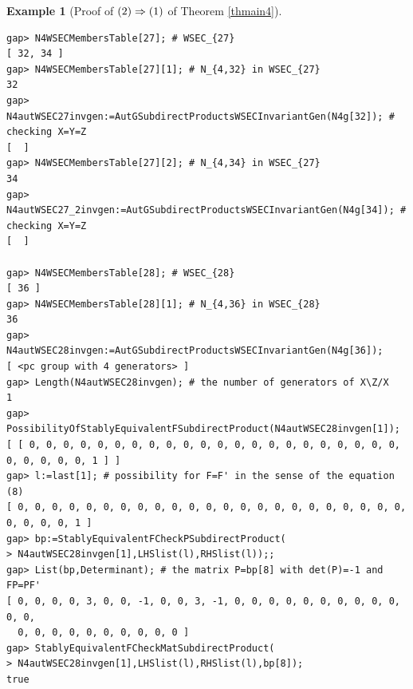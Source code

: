 \documentclass{amsart}
\theoremstyle{plain}
\theoremstyle{definition}
\newtheorem{example}[theorem]{Example}
\theoremstyle{remark}
\begin{document}
\begin{example}[Proof of ${\rm (2)}\Rightarrow {\rm (1)}$ of {Theorem \ref{thmain4}}]
\begin{verbatim}
gap> N4WSECMembersTable[27]; # WSEC_{27}
[ 32, 34 ]
gap> N4WSECMembersTable[27][1]; # N_{4,32} in WSEC_{27}
32
gap> N4autWSEC27invgen:=AutGSubdirectProductsWSECInvariantGen(N4g[32]); # checking X=Y=Z
[  ]
gap> N4WSECMembersTable[27][2]; # N_{4,34} in WSEC_{27}
34
gap> N4autWSEC27_2invgen:=AutGSubdirectProductsWSECInvariantGen(N4g[34]); # checking X=Y=Z
[  ]

gap> N4WSECMembersTable[28]; # WSEC_{28}
[ 36 ]
gap> N4WSECMembersTable[28][1]; # N_{4,36} in WSEC_{28}
36
gap> N4autWSEC28invgen:=AutGSubdirectProductsWSECInvariantGen(N4g[36]);
[ <pc group with 4 generators> ]
gap> Length(N4autWSEC28invgen); # the number of generators of X\Z/X
1
gap> PossibilityOfStablyEquivalentFSubdirectProduct(N4autWSEC28invgen[1]);
[ [ 0, 0, 0, 0, 0, 0, 0, 0, 0, 0, 0, 0, 0, 0, 0, 0, 0, 0, 0, 0, 0, 0, 0, 0, 0, 0, 0, 1 ] ]
gap> l:=last[1]; # possibility for F=F' in the sense of the equation (8)
[ 0, 0, 0, 0, 0, 0, 0, 0, 0, 0, 0, 0, 0, 0, 0, 0, 0, 0, 0, 0, 0, 0, 0, 0, 0, 0, 0, 1 ]
gap> bp:=StablyEquivalentFCheckPSubdirectProduct(
> N4autWSEC28invgen[1],LHSlist(l),RHSlist(l));;
gap> List(bp,Determinant); # the matrix P=bp[8] with det(P)=-1 and FP=PF'
[ 0, 0, 0, 0, 3, 0, 0, -1, 0, 0, 3, -1, 0, 0, 0, 0, 0, 0, 0, 0, 0, 0, 0, 0, 
  0, 0, 0, 0, 0, 0, 0, 0, 0, 0 ]
gap> StablyEquivalentFCheckMatSubdirectProduct(
> N4autWSEC28invgen[1],LHSlist(l),RHSlist(l),bp[8]);
true


\end{verbatim}
\end{example}
\end{document}
